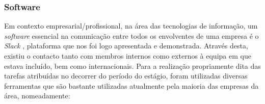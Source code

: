 \documentclass{article}
\begin{document}
\subsubsection{Software}
\hspace*{0.5cm} Em contexto empresarial/profissional, na área das tecnologias de informação, um \emph{software} essencial na comunicação entre todos os envolventes de uma empresa é o \emph{Slack} \cite{slack}, plataforma que nos foi logo apresentada e demonstrada. Através desta, existiu o contacto tanto com membros internos como externos à equipa em que estava incluído, bem como internacionais. \newline
\hspace*{0.5cm} Para a realização propriamente dita das tarefas atribuídas no decorrer do período do estágio, foram utilizadas diversas ferramentas que são bastante utilizadas atualmente pela maioria das empresas da área, nomeadamente:
\end{document}
